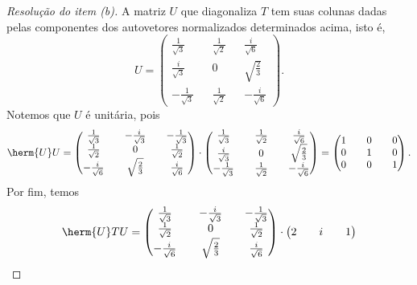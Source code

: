 \begin{proof}[Resolução do item (b)]
    A matriz \(U\) que diagonaliza \(T\) tem suas colunas dadas pelas componentes dos autovetores normalizados determinados acima, isto é,
    \begin{equation*}
        U = \begin{pmatrix}
            \frac{1}{\sqrt{3}} && \frac{1}{\sqrt{2}} && \frac{i}{\sqrt{6}}\\
            \frac{i}{\sqrt{3}} && 0 && \sqrt{\frac23}\\
            -\frac{1}{\sqrt{3}}&& \frac{1}{\sqrt{2}} && -\frac{i}{\sqrt{6}}
        \end{pmatrix}.
    \end{equation*}
    Notemos que \(U\) é unitária, pois
    \begin{equation*}
        \herm{U}U = \begin{pmatrix}
            \frac{1}{\sqrt{3}} && -\frac{i}{\sqrt{3}} && -\frac{1}{\sqrt{3}}\\
            \frac{1}{\sqrt{2}} && 0 && \frac{1}{\sqrt{2}}\\
            -\frac{i}{\sqrt{6}}&& \sqrt{\frac23} && \frac{i}{\sqrt{6}}
        \end{pmatrix}\cdot
        \begin{pmatrix}
            \frac{1}{\sqrt{3}} && \frac{1}{\sqrt{2}} && \frac{i}{\sqrt{6}}\\
            \frac{i}{\sqrt{3}} && 0 && \sqrt{\frac23}\\
            -\frac{1}{\sqrt{3}}&& \frac{1}{\sqrt{2}} && -\frac{i}{\sqrt{6}}
        \end{pmatrix} =
        \begin{pmatrix}
            1 && 0 && 0\\
            0 && 1 && 0\\
            0 && 0 && 1
        \end{pmatrix}.
    \end{equation*}
    Por fim, temos
    \begin{equation*}
        \herm{U}TU =
        \begin{pmatrix}
            \frac{1}{\sqrt{3}} && -\frac{i}{\sqrt{3}} && -\frac{1}{\sqrt{3}}\\
            \frac{1}{\sqrt{2}} && 0 && \frac{1}{\sqrt{2}}\\
            -\frac{i}{\sqrt{6}}&& \sqrt{\frac23} && \frac{i}{\sqrt{6}}
        \end{pmatrix}
        \cdot
        \begin{pmatrix}
            2 && i && 1\\

\end{pmatrix}
\end{equation*}
\end{proof}
